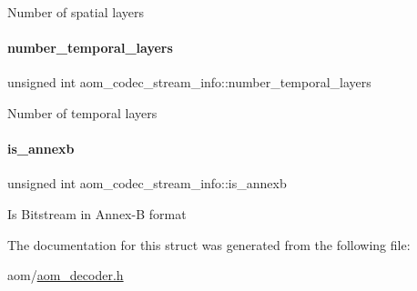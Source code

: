Number of spatial layers \mbox{\label{structaom__codec__stream__info_a8845a384d9d0b3d8670b8ad98b720c0e}} 
\paragraph{\texorpdfstring{number\+\_\+temporal\+\_\+layers}{number\_temporal\_layers}}
{\footnotesize\ttfamily unsigned int aom\+\_\+codec\+\_\+stream\+\_\+info\+::number\+\_\+temporal\+\_\+layers}

Number of temporal layers \mbox{\label{structaom__codec__stream__info_a1572ce7a1105c1db0a9dd43acb77b6c4}} 
\paragraph{\texorpdfstring{is\+\_\+annexb}{is\_annexb}}
{\footnotesize\ttfamily unsigned int aom\+\_\+codec\+\_\+stream\+\_\+info\+::is\+\_\+annexb}

Is Bitstream in Annex-\/B format 

The documentation for this struct was generated from the following file\+:\begin{DoxyCompactItemize}
\item 
aom/\hyperlink{aom__decoder_8h}{aom\+\_\+decoder.\+h}\end{DoxyCompactItemize}
